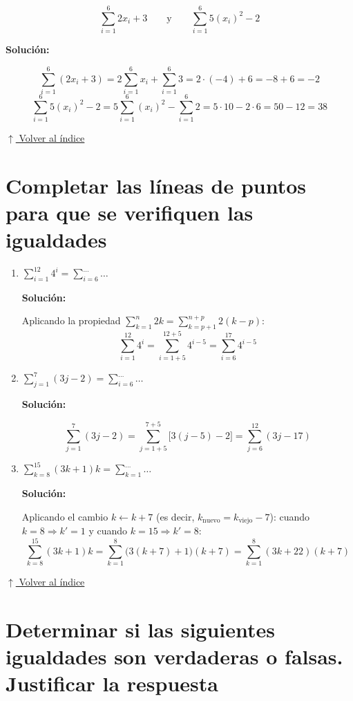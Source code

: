 \documentclass[12pt]{article}
\newcommand{\solucion}{%
    \vspace{0.8em}%
    \textbf{Solución:}%
}
\newcommand{\volverindice}{%
    \vspace{1em}%
    \begin{flushright}%
        \hyperlink{indice}{\small $\uparrow$ Volver al índice}%
    \end{flushright}%
}
\begin{document}
\[
\sum_{i=1}^{6} 2x_i + 3 \qquad \text{y} \qquad \sum_{i=1}^{6} 5(x_i)^2 - 2
\]

\solucion
\[
\sum_{i=1}^{6}(2x_i+3) = 2\sum_{i=1}^{6}x_i + \sum_{i=1}^{6}3
= 2\cdot(-4) + 6 = -8 + 6 = -2
\]
\[
\sum_{i=1}^{6}5(x_i)^2-2 = 5\sum_{i=1}^{6}(x_i)^2 - \sum_{i=1}^{6}2
= 5\cdot10 - 2\cdot6 = 50 - 12 = 38
\]

\volverindice
\newpage

\section{Completar las líneas de puntos para que se verifiquen las igualdades}

\begin{enumerate}[label=\alph*.-]
    \item $\displaystyle\sum_{i=1}^{12} 4^i = \sum_{i=6}^{\ldots} \ldots$

    \solucion

    Aplicando la propiedad $\displaystyle\sum_{k=1}^{n}2k = \sum_{k=p+1}^{n+p}2(k-p)$:
    \[
    \sum_{i=1}^{12} 4^i = \sum_{i=1+5}^{12+5} 4^{i-5} = \sum_{i=6}^{17} 4^{i-5}
    \]

    \item $\displaystyle\sum_{j=1}^{7}(3j-2) = \sum_{i=6}^{\ldots} \ldots$

    \solucion
    \[
    \sum_{j=1}^{7}(3j-2) = \sum_{j=1+5}^{7+5}\bigl[3(j-5)-2\bigr] = \sum_{j=6}^{12}(3j-17)
    \]

    \item $\displaystyle\sum_{k=8}^{15}(3k+1)k = \sum_{k=1}^{\ldots} \ldots$

    \solucion

    Aplicando el cambio $k \leftarrow k+7$ (es decir, $k_{\text{nuevo}} = k_{\text{viejo}}-7$):
    cuando $k=8 \Rightarrow k'=1$ y cuando $k=15 \Rightarrow k'=8$:
    \[
    \sum_{k=8}^{15}(3k+1)k
    = \sum_{k=1}^{8}\bigl(3(k+7)+1\bigr)(k+7)
    = \sum_{k=1}^{8}(3k+22)(k+7)
    \]

\end{enumerate}

\volverindice
\newpage

\section{Determinar si las siguientes igualdades son verdaderas o falsas. Justificar la respuesta}
\end{document}
